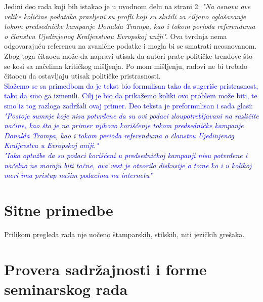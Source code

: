\documentclass[a4paper]{report}
\newcommand{\odgovor}[1]{\textcolor{blue}{#1}}
\begin{document}
Jedini deo rada koji bih istakao je u uvodnom delu na strani 2: \emph{"Na osnovu ove velike količine podataka pravljeni su profli koji su služili za ciljano oglašavanje tokom predsedničke kampanje Donalda Trampa, kao i tokom perioda referenduma o članstvu Ujedinjenog Kraljevstvau Evropskoj uniji"}. Ova tvrdnja nema odgovarajuću referencu na zvanične podatke i mogla bi se smatrati neosnovanom. Zbog toga čitaocu može da napravi utisak da autori prate političke trendove što se kosi sa načelima kritičkog mišljenja. Po mom mišljenju, radovi ne bi trebalo čitaocu da ostavljaju utisak političke pristrasnosti.
\\
\odgovor{Slažemo se sa primedbom da je tekst bio formulisan tako da sugeriše pristrasnost, tako da smo ga izmenili. Cilj je bio da prikažemo koliki ovo problem može biti, te smo iz tog razloga zadržali ovaj primer. Deo teksta je preformulisan i sada glasi: \emph{"Postoje sumnje koje nisu potvrđene da su ovi podaci zloupotrebljavani na različite načine, kao što je na primer njihovo korišćenje tokom predsedničke kampanje Donalda Trampa, kao i tokom perioda referenduma o članstvu Ujedinjenog Kraljevstva u Evropskoj uniji."\\ "Iako optužbe da su podaci korišćeni u predsedničkoj kampanji nisu potvrđene i načelno ne moraju biti tačne, ova vest je otvorila diskusije o tome ko i u kolikoj meri ima pristup našim podacima na internetu"}}

\section{Sitne primedbe}

Prilikom pregleda rada nje uočeno štamparskih, stilskih, niti jezičkih grešaka.

\section{Provera sadržajnosti i forme seminarskog rada}
\end{document}
